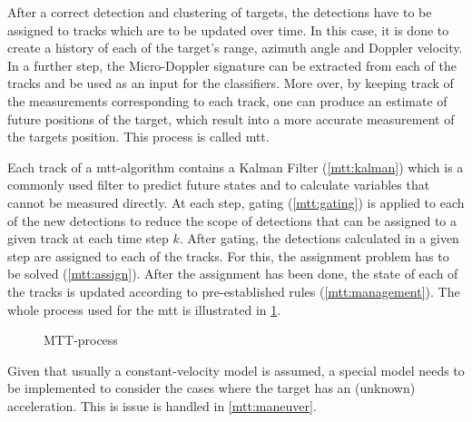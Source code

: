 After a correct detection and clustering of targets, the detections have to be assigned to tracks which are to be updated over time. In this case, it is done to create a history of each of the target's range, azimuth angle and Doppler velocity. In a further step, the Micro-Doppler signature can be extracted from each of the tracks and be used as an input for the classifiers. More over, by keeping track of the measurements corresponding to each track, one can produce an estimate of future positions of the target, which result into a more accurate measurement of the targets position. This process is called \ac{mtt}.

Each track of a \ac{mtt}-algorithm contains a Kalman Filter (\cref{mtt:kalman}) which is a commonly used filter to predict future states and to calculate variables that cannot be measured directly. At each step, gating (\cref{mtt:gating}) is applied to each of the new detections to reduce the scope of detections that can be assigned to a given track at each time step $k$. After gating, the detections calculated in a given step are assigned to each of the tracks. For this, the assignment problem has to be solved (\cref{mtt:assign}). After the assignment has been done, the state of each of the tracks is updated according to pre-established rules (\cref{mtt:management}). The whole process used for the \ac{mtt} is illustrated in \cref{fig:mtt}.
\begin{figure}[h]
	\centering
	
	\caption{MTT-process}
	\label{fig:mtt}
\end{figure} 
Given that usually a constant-velocity model is assumed, a special model needs to be implemented to consider the cases where the target has an (unknown) acceleration. This is issue is handled in \cref{mtt:maneuver}.